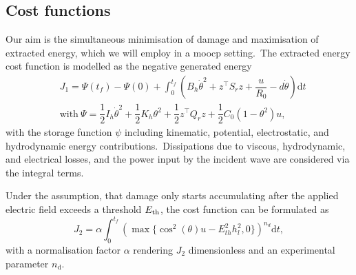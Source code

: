 \subsection{Cost functions}
Our aim is the simultaneous minimisation of damage and maximisation of extracted energy, which we will employ in a \ac{moocp} setting.\ 
The extracted energy cost function is modelled as the negative generated energy
\begin{equation}\label{eq:J1}
	\begin{split}
		& J_1 = \Psi(t_f)-\Psi(0) +\int_0^{t_f} \left(B_h\dot{\theta}^2 +z^\intercal S_r z +\dfrac{u}{R_0} - d \dot{\theta}\right) \text{d}t \\
		& \text{with}\ \Psi = \dfrac{1}{2}I_h\dot{\theta}^2+\dfrac{1}{2}K_h{\theta}^2+ \dfrac{1}{2}z^\intercal Q_r z + \dfrac{1}{2} C_0\left(1 - \theta^2 \right) u,
	\end{split}
\end{equation}
with the storage function $\psi$ including kinematic, potential, electrostatic, and hydrodynamic energy contributions.\ 
Dissipations due to viscous, hydrodynamic, and electrical losses, and the power input by the incident wave are considered via the integral terms.\ 

Under the assumption, that damage only starts accumulating after the applied electric field exceeds a threshold $E_\mathrm{th}$, the cost function can be formulated as
\begin{equation}\label{eq:J2}
	J_2 = \alpha \int_0^{t_f} \left(\max \{ \cos^2(\theta)u-E_{th}^2 h_l^2,0 \} \right)^{n_d} \text{d}t,
\end{equation}
with a normalisation factor $\alpha$ rendering $J_2$ dimensionless and an experimental parameter $n_\mathrm{d}$.\ 
